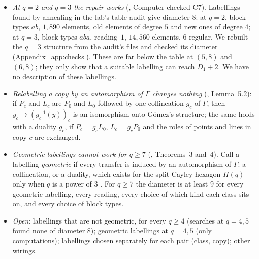 \documentclass[11pt]{amsart}
\theoremstyle{definition}
\theoremstyle{remark}
\begin{document}
\begin{itemize}[leftmargin=1.5em]
\item \emph{At $q=2$ and $q=3$ the repair works} (, Computer-checked C7). Labellings found by annealing in the lab's table audit give diameter $8$: at $q=2$, block types $ab$, $1{,}890$ elements, old elements of degree $5$ and new ones of degree $4$; at $q=3$, block types $aba$, reading~$1$, $14{,}560$ elements, $6$-regular. We rebuilt the $q=3$ structure from the audit's files and checked its diameter (Appendix~\ref{app:checks}). These are far below the table at $(5,8)$ and $(6,8)$; they only show that a suitable labelling can reach $D_1+2$. We have no description of these labellings.
\item \emph{Relabelling a copy by an automorphism of $\Gamma$ changes nothing} (, Lemma~5.2): if $P_c$ and $L_c$ are $P_0$ and $L_0$ followed by one collineation $g_c$ of $\Gamma$, then $y_c\mapsto (g_c^{-1}(y))_c$ is an isomorphism onto G\'omez's structure; the same holds with a duality $g_c$, if $P_c=g_cL_0$, $L_c=g_cP_0$ and the roles of points and lines in copy $c$ are exchanged.
\item \emph{Geometric labellings cannot work for $q\ge7$} (, Theorems~3 and~4). Call a labelling \emph{geometric} if every transfer is induced by an automorphism of $\Gamma$: a collineation, or a duality, which exists for the split Cayley hexagon $H(q)$ only when $q$ is a power of $3$ \cite{VM98}. For $q\ge7$ the diameter is at least $9$ for every geometric labelling, every reading, every choice of which kind each class sits on, and every choice of block types.
\item \emph{Open}: labellings that are not geometric, for every $q\ge4$ (searches at $q=4,5$ found none of diameter $8$); geometric labellings at $q=4,5$ (only computations); labellings chosen separately for each pair (class, copy); other wirings.
\end{itemize}
\end{document}
